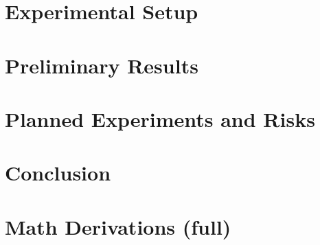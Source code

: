 \documentclass{article}
\begin{document}


\section{Experimental Setup}\label{sec:setup}



\section{Preliminary Results}\label{sec:results}



\section{Planned Experiments and Risks}\label{sec:plan}



\section{Conclusion}\label{sec:conclusion}






\appendix
\section{Math Derivations (full)}\label{app:math}

\end{document}
